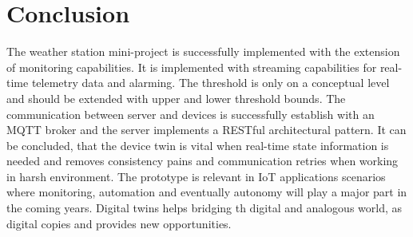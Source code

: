 \section{Conclusion} \label{sec:conclusion}
The weather station mini-project is successfully implemented with the extension of monitoring capabilities. It is implemented with streaming capabilities for real-time telemetry data and alarming. The threshold is only on a conceptual level and should be extended with upper and lower threshold bounds. The communication between server and devices is successfully establish with an MQTT broker and the server implements a RESTful architectural pattern. It can be concluded, that the device twin is vital when real-time state information is needed and removes consistency pains and communication retries when working in harsh environment. 
The prototype is relevant in IoT applications scenarios where monitoring, automation and eventually autonomy will play a major part in the coming years. Digital twins helps bridging th digital and analogous world, as digital copies and provides new opportunities.